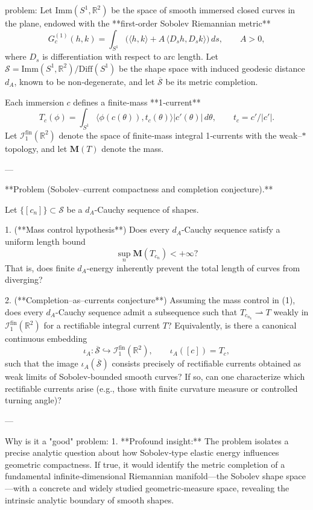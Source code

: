 problem:  
Let $\mathrm{Imm}(S^{1},\mathbb{R}^{2})$ be the space of smooth immersed closed curves in the plane, endowed with the **first‑order Sobolev Riemannian metric**
\[
G^{(1)}_c(h,k)=\int_{S^{1}}\!\big(\langle h, k\rangle + A\,\langle D_s h, D_s k\rangle\big)\,ds,\qquad A>0,
\]
where \(D_s\) is differentiation with respect to arc length.  Let $\mathcal{S}=\mathrm{Imm}(S^{1},\mathbb{R}^{2})/\mathrm{Diff}(S^{1})$ be the shape space with induced geodesic distance \(d_A\), known to be non‑degenerate, and let \(\overline{\mathcal{S}}\) be its metric completion.

Each immersion \(c\) defines a finite‑mass **1‑current**
\[
T_c(\phi)=\int_{S^{1}}\langle \phi(c(\theta)),t_c(\theta)\rangle|c'(\theta)|\,d\theta,\qquad t_c=c'/|c'|.
\]
Let \(\mathcal{I}_1^{\mathrm{fin}}(\mathbb{R}^{2})\) denote the space of finite‑mass integral 1‑currents with the weak–$*$ topology, and let \(\mathbf M(T)\) denote the mass.

---

**Problem (Sobolev–current compactness and completion conjecture).**

Let $\{[c_n]\} \subset \mathcal{S}$ be a \(d_A\)-Cauchy sequence of shapes.

1. (**Mass control hypothesis**)  
   Does every \(d_A\)-Cauchy sequence satisfy a uniform length bound  
   \[
   \sup_n \mathbf{M}(T_{c_n}) < +\infty?
   \]
   That is, does finite \(d_A\)-energy inherently prevent the total length of curves from diverging?

2. (**Completion–as–currents conjecture**)  
   Assuming the mass control in (1), does every \(d_A\)-Cauchy sequence admit a subsequence such that \(T_{c_{n_k}}\rightharpoonup T\) weakly in \(\mathcal{I}_1^{\mathrm{fin}}(\mathbb{R}^{2})\) for a rectifiable integral current \(T\)?  
   Equivalently, is there a canonical continuous embedding
   \[
   \iota_A:\overline{\mathcal{S}}\hookrightarrow \mathcal{I}_1^{\mathrm{fin}}(\mathbb{R}^{2}),\qquad \iota_A([c])=T_c,
   \]
   such that the image \(\iota_A(\overline{\mathcal{S}})\) consists precisely of rectifiable currents obtained as weak limits of Sobolev‑bounded smooth curves?  
   If so, can one characterize which rectifiable currents arise (e.g., those with finite curvature measure or controlled turning angle)?

---

Why is it a "good" problem:  
1. **Profound insight:**  The problem isolates a precise analytic question about how Sobolev‑type elastic energy influences geometric compactness.  If true, it would identify the metric completion of a fundamental infinite‑dimensional Riemannian manifold—the Sobolev shape space—with a concrete and widely studied geometric‑measure space, revealing the intrinsic analytic boundary of smooth shapes.  

